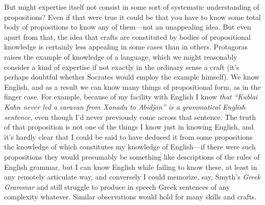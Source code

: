 \documentclass[11pt]{amsart}
\begin{document}
But might expertise itself not consist in some sort of systematic
understanding of propositions? Even if that were true it could be that
you have to know some total body of propositions to know any of
them---not an unappealing idea. But even apart from that, the idea
that crafts are constituted by bodies of propositional knowledge is
certainly less appealing in some cases than in others. Protagoras
raises the example of knowledge of a language, which we might
reasonably consider a kind of expertise if not exactly in the ordinary
sense a craft (it's perhaps doubtful whether Socrates would employ the
example himself). We know English, and as a result we can know many
things of propositional form, as in the finger case. For example,
because of my facility with English I know \emph{that ``Kublai Kahn
never led a caravan from Xanadu to Abidjan'' is a grammatical English
sentence,} even though I'd never previously come across that sentence.
The truth of that proposition is not one of the things I know just in
knowing English, and it's hardly clear that I could be said to have
deduced it from some propositions the knowledge of which constitutes
my knowledge of English---if there were such propositions they would
presumably be something like descriptions of the rules of English
grammar, but I can know English while failing to know these, at least
in any remotely articulate way, and conversely I could memorize, say,
Smyth's \emph{Greek Grammar} and still struggle to produce in speech
Greek sentences of any complexity whatever. Similar observations would
hold for many skills and crafts.
\end{document}
